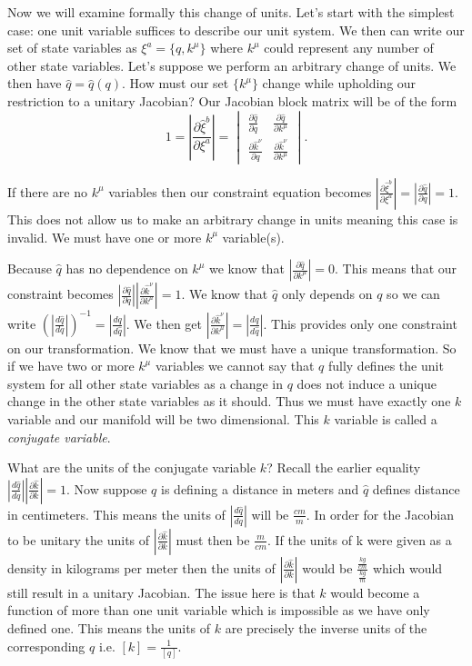 \documentclass{article}
\begin{document}
	Now we will examine formally this change of units. Let's start with the simplest case: one unit variable suffices to describe our unit system. We then can write our set of state variables as $\xi^a = \{q,k^\mu\}$ where $k^\mu$ could represent any number of other state variables. Let's suppose we perform an arbitrary change of units. We then have $\hat{q} = \hat{q}(q)$. How must our set $\{k^\mu\}$ change while upholding our restriction to a unitary Jacobian? Our Jacobian block matrix will be of the form $$1 = \left|\frac{\partial\hat{\xi}^b}{\partial\xi^a}\right| = \begin{vmatrix}
\frac{\partial \hat{q}}{\partial q} & \frac{\partial \hat{q}}{\partial k^\mu} \\
\frac{\partial \hat{k}^\nu}{\partial q} & \frac{\partial \hat{k}^\nu}{\partial k^\mu}
\end{vmatrix}.$$

	If there are no $k^\mu$ variables then our constraint equation becomes $\left|\frac{\partial\hat{\xi}^b}{\partial\xi^a}\right| = \left|\frac{\partial \hat{q}}{\partial q}\right| = 1$. This does not allow us to make an arbitrary change in units meaning this case is invalid. We must have one or more $k^\mu$ variable(s).

	Because $\hat{q}$ has no dependence on $k^\mu$ we know that $\left|\frac{\partial \hat{q}}{\partial k^\mu}\right| = 0$. This means that our constraint becomes $\left|\frac{\partial \hat{q}}{\partial q}\right|\left|\frac{\partial \hat{k}^\nu}{\partial k^\mu}\right| = 1$. We know that $\hat{q}$ only depends on $q$ so we can write $(\left|\frac{d \hat{q}}{d q}\right|)^{-1} = \left|\frac{d q}{d \hat{q}}\right|$. We then get $\left|\frac{\partial \hat{k}^\nu}{\partial k^\mu}\right| = \left|\frac{d q}{d \hat{q}}\right|$. This provides only one constraint on our transformation. We know that we must have a unique transformation. So if we have two or more $k^\mu$ variables we cannot say that $q$ fully defines the unit system for all other state variables as a change in $q$ does not induce a unique change in the other state variables as it should. Thus we must have exactly one $k$ variable and our manifold will be two dimensional. This $k$ variable is called a \textit{conjugate variable}.
	
	What are the units of the conjugate variable $k$? Recall the earlier equality $\left|\frac{d\hat{q}}{dq}\right|\left|\frac{\partial \hat{k}}{\partial k}\right| = 1$. Now suppose $q$ is defining a distance in meters and $\hat{q}$ defines distance in centimeters. This means the units of $\left|\frac{d\hat{q}}{dq}\right|$ will be $\frac{cm}{m}$. In order for the Jacobian to be unitary the units of $\left|\frac{\partial \hat{k}}{\partial k}\right|$ must then be $\frac{m}{cm}$. If the units of k were given as a density in kilograms per meter then the units of $\left|\frac{\partial \hat{k}}{\partial k}\right|$ would be $\frac{\frac{kg}{cm}}{\frac{kg}{m}}$ which would still result in a unitary Jacobian. The issue here is that $k$ would become a function of more than one unit variable which is impossible as we have only defined one. This means the units of $k$ are precisely the inverse units of the corresponding $q$ i.e. $[k] = \frac{1}{[q]}$.
\end{document}
